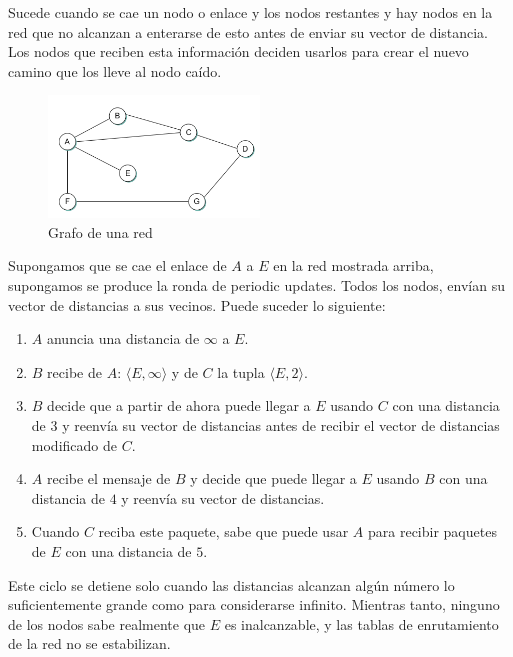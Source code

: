 Sucede cuando se cae un nodo o enlace y los nodos restantes y hay nodos en la red que no alcanzan a enterarse de esto antes de enviar su vector de distancia. Los nodos que reciben esta información deciden usarlos para crear el nuevo camino que los lleve al nodo caído. 
\begin{figure}[H]
	\centering
	\includegraphics[width=0.5\textwidth
]{images/network-graph.png}
	\caption[Grafo de una red]{Grafo de una red}
	\label{fig:network-graph}
\end{figure}

Supongamos que se cae el enlace de \(A\) a \(E\) en la red mostrada arriba, supongamos se produce la ronda de periodic updates. Todos los nodos, envían su vector de distancias a sus vecinos. Puede suceder lo siguiente:
\begin{enumerate}
  \item  \(A\) anuncia una distancia de \(\infty\) a \(E\).
  \item \(B\) recibe de \(A\): \(\langle E,\infty\rangle\) y de \(C\) la tupla \(\langle E, 2\rangle\).
  \item \(B\) decide que a partir de ahora puede llegar a \(E\) usando \(C\) con una distancia de \(3\) y reenvía su vector de distancias antes de recibir el vector de distancias modificado de \(C\).
  \item \(A\) recibe el mensaje de \(B\) y decide que puede llegar a \(E\) usando \(B\) con una distancia de \(4\) y reenvía su vector de distancias.
  \item Cuando \(C\) reciba este paquete, sabe que puede usar \(A\) para recibir paquetes de \(E\) con una distancia de \(5\).
\end{enumerate}

Este ciclo se detiene solo cuando las distancias alcanzan algún número lo suficientemente grande como para considerarse infinito. Mientras tanto, ninguno de los nodos sabe realmente que \(E\) es inalcanzable, y las tablas de enrutamiento de la red no se estabilizan.


